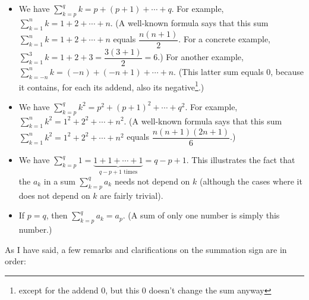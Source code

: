 \documentclass[numbers=enddot,12pt,final,onecolumn,notitlepage]{scrartcl}%
\theoremstyle{definition}
\let\sumnonlimits\sum
\renewcommand{\sum}{\sumnonlimits\limits}
\begin{document}
\begin{itemize}
\item We have $\sum_{k=p}^{q}k=p+\left(  p+1\right)  +\cdots+q$. For example,
$\sum_{k=1}^{n}k=1+2+\cdots+n$. (A well-known formula says that this sum
$\sum_{k=1}^{n}k=1+2+\cdots+n$ equals $\dfrac{n\left(  n+1\right)  }{2}$. For
a concrete example, $\sum_{k=1}^{3}k=1+2+3=\dfrac{3\left(  3+1\right)  }{2}%
=6$.) For another example, $\sum_{k=-n}^{n}k=\left(  -n\right)  +\left(
-n+1\right)  +\cdots+n$. (This latter sum equals $0$, because it contains, for
each its addend, also its negative\footnote{except for the addend $0$, but
this $0$ doesn't change the sum anyway}.)

\item We have $\sum_{k=p}^{q}k^{2}=p^{2}+\left(  p+1\right)  ^{2}+\cdots
+q^{2}$. For example, $\sum_{k=1}^{n}k^{2}=1^{2}+2^{2}+\cdots+n^{2}$. (A
well-known formula says that this sum $\sum_{k=1}^{n}k^{2}=1^{2}+2^{2}%
+\cdots+n^{2}$ equals $\dfrac{n\left(  n+1\right)  \left(  2n+1\right)  }{6}$.)

\item We have $\sum_{k=p}^{q}1=\underbrace{1+1+\cdots+1}_{q-p+1\text{ times}%
}=q-p+1$. This illustrates the fact that the $a_{k}$ in a sum $\sum_{k=p}%
^{q}a_{k}$ needs not depend on $k$ (although the cases where it does not
depend on $k$ are fairly trivial).

\item If $p=q$, then $\sum_{k=p}^{q}a_{k}=a_{p}$. (A sum of only one number is
simply this number.)
\end{itemize}

As I have said, a few remarks and clarifications on the summation sign are in order:
\end{document}
